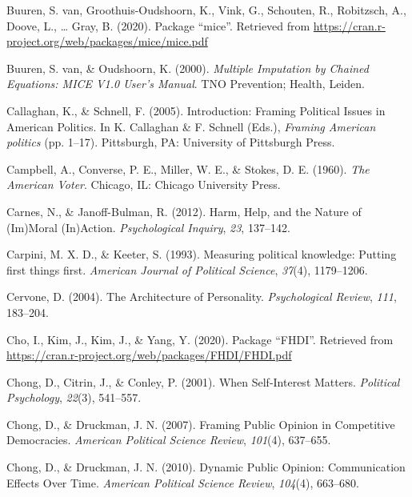 \documentclass[12pt,econ]{sources/authesis}
\begin{document}
\leavevmode\hypertarget{ref-buuren_2020_package}{}%
Buuren, S. van, Groothuis-Oudshoorn, K., Vink, G., Schouten, R., Robitzsch, A., Doove, L., \ldots{} Gray, B. (2020). Package ``mice''. Retrieved from \url{https://cran.r-project.org/web/packages/mice/mice.pdf}

\leavevmode\hypertarget{ref-buuren_2000_multiple}{}%
Buuren, S. van, \& Oudshoorn, K. (2000). \emph{Multiple Imputation by Chained Equations: MICE V1.0 User's Manual}. TNO Prevention; Health, Leiden.

\leavevmode\hypertarget{ref-callaghan_introduction_2005}{}%
Callaghan, K., \& Schnell, F. (2005). Introduction: Framing Political Issues in American Politics. In K. Callaghan \& F. Schnell (Eds.), \emph{Framing American politics} (pp. 1--17). Pittsburgh, PA: University of Pittsburgh Press.

\leavevmode\hypertarget{ref-campbell_american_1960}{}%
Campbell, A., Converse, P. E., Miller, W. E., \& Stokes, D. E. (1960). \emph{The American Voter}. Chicago, IL: Chicago University Press.

\leavevmode\hypertarget{ref-carnes_2012_harm}{}%
Carnes, N., \& Janoff-Bulman, R. (2012). Harm, Help, and the Nature of (Im)Moral (In)Action. \emph{Psychological Inquiry}, \emph{23}, 137--142.

\leavevmode\hypertarget{ref-carpini_1993_measuring}{}%
Carpini, M. X. D., \& Keeter, S. (1993). Measuring political knowledge: Putting first things first. \emph{American Journal of Political Science}, \emph{37}(4), 1179--1206.

\leavevmode\hypertarget{ref-cervone_2004_architecture}{}%
Cervone, D. (2004). The Architecture of Personality. \emph{Psychological Review}, \emph{111}, 183--204.

\leavevmode\hypertarget{ref-cho_2020_package}{}%
Cho, I., Kim, J., Kim, J., \& Yang, Y. (2020). Package ``FHDI''. Retrieved from \url{https://cran.r-project.org/web/packages/FHDI/FHDI.pdf}

\leavevmode\hypertarget{ref-chong_when_2001}{}%
Chong, D., Citrin, J., \& Conley, P. (2001). When Self-Interest Matters. \emph{Political Psychology}, \emph{22}(3), 541--557.

\leavevmode\hypertarget{ref-chong_framing_2007}{}%
Chong, D., \& Druckman, J. N. (2007). Framing Public Opinion in Competitive Democracies. \emph{American Political Science Review}, \emph{101}(4), 637--655.

\leavevmode\hypertarget{ref-chong_dynamic_2010}{}%
Chong, D., \& Druckman, J. N. (2010). Dynamic Public Opinion: Communication Effects Over Time. \emph{American Political Science Review}, \emph{104}(4), 663--680.
\end{document}

